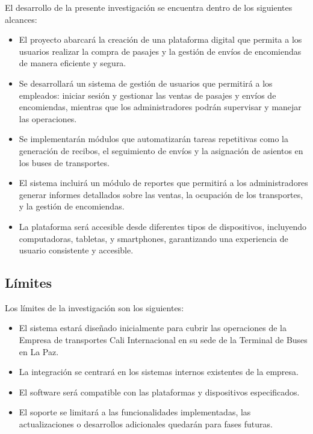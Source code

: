 		El desarrollo de la presente investigación se encuentra dentro de los siguientes alcances:
		
		\begin{itemize}[label=$\bullet$, left=0cm, labelsep = 1.05cm, topsep = 0pt, parsep = 0pt]
			
			\item El proyecto abarcará la creación de una plataforma digital que permita a los usuarios realizar la compra de pasajes y la gestión de envíos de encomiendas de manera eficiente y segura.
			
			\item Se desarrollará un sistema de gestión de usuarios que permitirá a los empleados: iniciar sesión y gestionar las ventas de pasajes y envíos de encomiendas, mientras que los administradores podrán supervisar y manejar las operaciones.
			
			\item Se implementarán módulos que automatizarán tareas repetitivas como la generación de recibos, el seguimiento de envíos y la asignación de asientos en los buses de transportes.
			
			\item El sistema incluirá un módulo de reportes que permitirá a los administradores generar informes detallados sobre las ventas, la ocupación de los transportes, y la gestión de encomiendas.
			
			\item La plataforma será accesible desde diferentes tipos de dispositivos, incluyendo computadoras, tabletas, y smartphones, garantizando una experiencia de usuario consistente y accesible.
			
		\end{itemize}
		
	\subsection{Límites}
	
		Los límites de la investigación son los siguientes:
		
		\begin{itemize}[label=$\bullet$, left=0cm, labelsep = 1.05cm, topsep = 0pt, parsep = 0pt]
			
			\item El sistema estará diseñado inicialmente para cubrir las operaciones de la Empresa de transportes Cali Internacional en su sede de la Terminal de Buses en La Paz.
			
			\item La integración se centrará en los sistemas internos existentes de la empresa. %
			
			\item El software será compatible con las plataformas y dispositivos especificados. %
			
			\item El soporte se limitará a las funcionalidades implementadas, las actualizaciones o desarrollos adicionales quedarán para fases futuras.
			
		\end{itemize}
		

